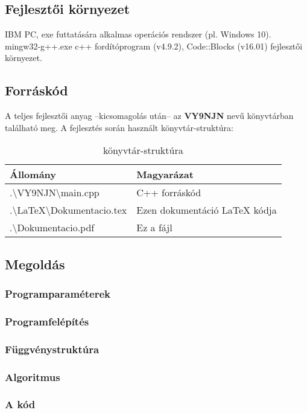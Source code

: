 \documentclass[a4paper]{article}
\begin{document}
    \subsection{Fejlesztői környezet}
    IBM PC, exe futtatására alkalmas operációs rendszer (pl. Windows 10). \\
    mingw32-g++.exe c++ fordítóprogram (v4.9.2), Code::Blocks (v16.01) fejlesztői környezet.
    \subsection{Forráskód}
    A teljes fejlesztői anyag –kicsomagolás után– az \textbf{VY9NJN} nevű könyvtárban található meg.
    A fejlesztés során használt könyvtár-struktúra:
    \begin{table}[H]
      \centering
      \caption{könyvtár-struktúra}
      \label{tab:table3}
      \begin{tabular}{ll}
        \toprule
        Állomány & Magyarázat \\
        \midrule
        .\textbackslash VY9NJN\textbackslash main.cpp & C++ forráskód \\
        .\textbackslash LaTeX\textbackslash Dokumentacio.tex & Ezen dokumentáció LaTeX kódja \\
        .\textbackslash Dokumentacio.pdf & Ez a fájl \\
        \bottomrule
      \end{tabular}
    \end{table}
    \subsection{Megoldás}
      \subsubsection{Programparaméterek}
      \subsubsection{Programfelépítés}
      \subsubsection{Függvénystruktúra}
      \subsubsection{Algoritmus}
      \subsubsection{A kód}
\end{document}
